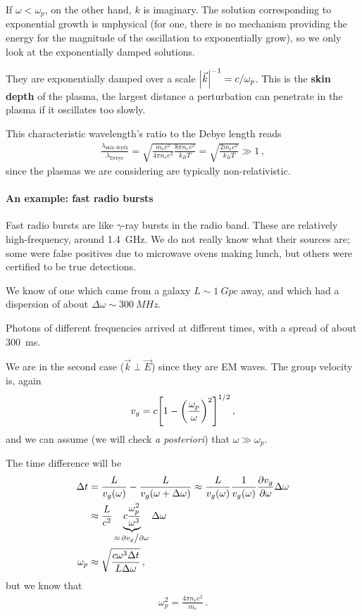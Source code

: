 \documentclass[main.tex]{subfiles}
\begin{document}
If \(\omega < \omega _p\), on the other hand, \(k\) is imaginary.
The solution corresponding to exponential growth is unphysical (for one, there is no mechanism providing the energy for the magnitude of the oscillation to exponentially grow), so we only look at the exponentially damped solutions. 

They are exponentially damped over a scale \(\abs{\vec{k}}^{-1} = c / \omega _p\).
This is the \textbf{skin depth} of the plasma, the largest distance a perturbation can penetrate in the plasma if it oscillates too slowly.

This characteristic wavelength's ratio to the Debye length reads 
%
\begin{align}
\frac{\lambda _{\text{skin depth}}}{ \lambda _{\text{Debye}}} 
= \sqrt{\frac{m_e c^2}{4 \pi n_e e^2} \frac{8 \pi n_e e^2}{k_B T}}
= \sqrt{\frac{2 m_e c^2}{k_B T}} \gg 1
\,,
\end{align}
%
since the plasmas we are considering are typically non-relativistic. 

\paragraph{An example: fast radio bursts}

Fast radio bursts are like \(\gamma \)-ray bursts in the radio band.
These are relatively high-frequency, around \SI{1.4}{GHz}. 
We do not really know what their sources are; some were false positives due to microwave ovens making lunch, but others were certified to be true detections.

We know of one which came from a galaxy \(L \sim \SI{1}{Gpc}\) away, and which had a dispersion of about \(\Delta \omega \sim \SI{300}{MHz}\). 

Photons of different frequencies arrived at different times, with a spread of about \SI{300}{ms}. 

We are in the second case (\(\vec{k} \perp \vec{E}\)) since they are EM waves. 
The group velocity is, again
%
\begin{align}
v_g = c \qty[ 1 - \qty(\frac{\omega _p}{\omega})^2]^{1/2}
\,,
\end{align}
%
and we can assume (we will check \emph{a posteriori}) that \(\omega \gg \omega _p\). 

The time difference will be 
%
\begin{subequations}
\begin{align}
\Delta t &= \frac{L}{v_g (\omega)} - \frac{L}{v_g (\omega + \Delta \omega )} 
\approx \frac{L}{v_g(\omega )} \frac{1}{v_g(\omega )}\pdv{v_g}{\omega } \Delta \omega  \\
&\approx \frac{L}{c^2} \underbrace{c \frac{\omega _p^2}{\omega^3}}_{\approx \pdv*{v_g}{\omega }} \Delta \omega \\
\omega _p &\approx \sqrt{\frac{ c \omega^3 \Delta t}{L \Delta \omega }}
\,,
\end{align}
\end{subequations}
%
but we know that 
%
\begin{align}
\omega _p^2 = \frac{ 4 \pi n_e e^2}{m_e}
\,.
\end{align}
\end{document}
